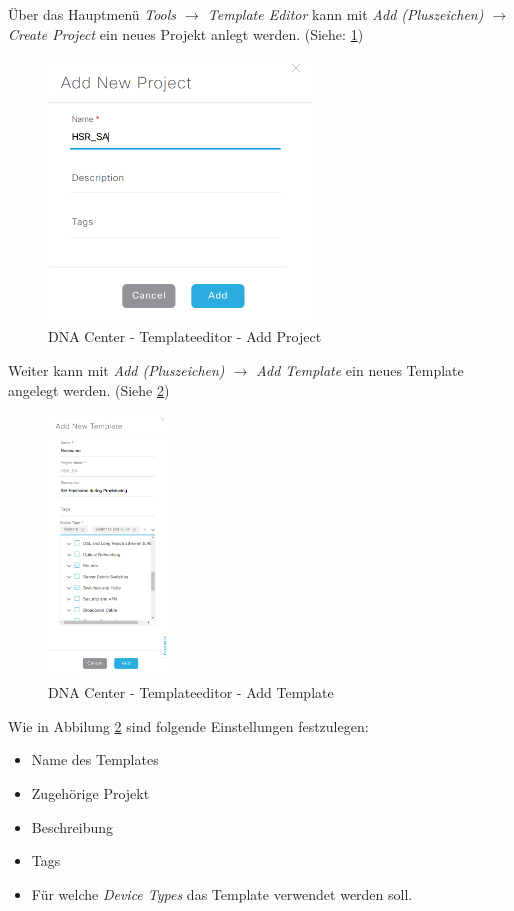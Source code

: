 Über das Hauptmenü \textit{Tools $\rightarrow$ Template Editor} kann mit \textit{Add (Pluszeichen) $\rightarrow$ Create Project} ein neues Projekt anlegt werden. (Siehe: \ref{fig:dna-center-template-editor-add-project})

\begin{figure}[H]
	\centering
	\includegraphics[height=7cm]{img/secondtry/dna-center-template-editor-add-project.png}
	\caption{DNA Center - Templateeditor - Add Project}
	\label{fig:dna-center-template-editor-add-project}
\end{figure}

Weiter kann mit \textit{Add (Pluszeichen) $\rightarrow$ Add Template} ein neues Template angelegt werden. (Siehe \ref{fig:dna-center-template-editor-add-template})

\begin{figure}[H]
	\centering
	\includegraphics[height=7cm]{img/secondtry/dna-center-template-editor-add-template.png}
	\caption{DNA Center - Templateeditor - Add Template}
	\label{fig:dna-center-template-editor-add-template}
\end{figure}

Wie in Abbilung \ref{fig:dna-center-template-editor-add-template} sind folgende Einstellungen festzulegen:
\begin{itemize}
	\item Name des Templates
	\item Zugehörige Projekt
	\item Beschreibung
	\item Tags
	\item Für welche \textit{Device Types} das Template verwendet werden soll.
\end{itemize}

